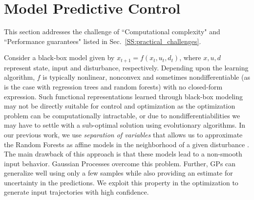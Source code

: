 \section{Model Predictive Control}
\label{S:dpc}

This section addresses the challenge of ``Computational complexity" and ``Performance guarantees" listed in Sec.~\ref{SS:practical_challenges}.

Consider a black-box model given by $x_{t+1}=f(x_t,u_t,d_t)$, where $x,u,d$ represent state, input and disturbance, respectively. Depending upon the learning algorithm, $f$ is typically nonlinear, nonconvex and sometimes nondifferentiable (as is the case with regression trees and random forests) with no closed-form expression. 
Such functional representations learned through black-box modeling may not be directly suitable for control and optimization as the optimization problem can be computationally intractable, or due to nondifferentiabilities we may have to settle with a sub-optimal solution using evolutionary algorithms. 
In our previous work, we use \textit{separation of variables} that allows us to approximate the Random Forests as affine models in the neighborhood of a given disturbance \cite{JainCDC2017}. 
The main drawback of this approach is that these models lead to a non-smooth input behavior. 
Gaussian Processes overcome this problem.
Further, GPs can generalize well using only a few samples while also providing an estimate for uncertainty in the predictions. 
We exploit this property in the optimization to generate input trajectories with high confidence.


